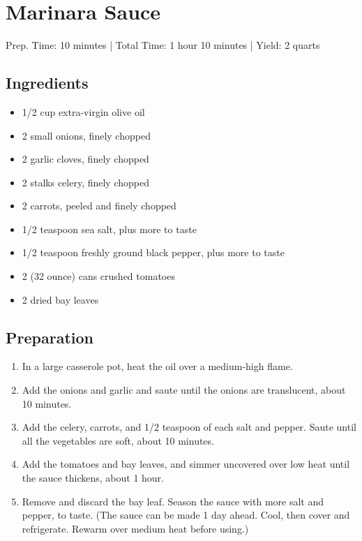 \section{Marinara Sauce}

\noindent Prep. Time: 10 minutes |
Total Time: 1 hour 10 minutes | 
Yield: 2 quarts

\subsection{Ingredients}
\begin{multicols}{2}
\begin{itemize}
    \item 1/2 cup extra-virgin olive oil
    \item 2 small onions, finely chopped
    \item 2 garlic cloves, finely chopped
    \item 2 stalks celery, finely chopped
    \item 2 carrots, peeled and finely chopped
    \item 1/2 teaspoon sea salt, plus more to taste
    \item 1/2 teaspoon freshly ground black pepper, plus more to taste
    \item 2 (32 ounce) cans crushed tomatoes
    \item 2 dried bay leaves
\end{itemize}
\end{multicols}

\subsection{Preparation}
\begin{enumerate}
    \item In a large casserole pot, heat the oil over a medium-high flame.
    \item Add the onions and garlic and saute until the onions are translucent, about 10 minutes. 
    \item Add the celery, carrots, and 1/2 teaspoon of each salt and pepper. Saute until all the vegetables are soft, about 10 minutes. 
    \item Add the tomatoes and bay leaves, and simmer uncovered over low heat until the sauce thickens, about 1 hour.
    \item Remove and discard the bay leaf. Season the sauce with more salt and pepper, to taste. (The sauce can be made 1 day ahead. Cool, then cover and refrigerate. Rewarm over medium heat before using.)
\end{enumerate}
